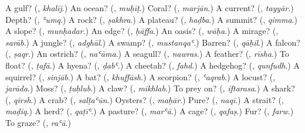 \begin{tcolorbox}[breakable,colback=teal!4,colframe=teal!35!black,title={Before you move on}]
A gulf? (\textbf{}, \emph{khalīj}.) An ocean? (\textbf{}, \emph{muḥīṭ}.) Coral? (\textbf{}, \emph{marjān}.) A current? (\textbf{}, \emph{tayyār}.) Depth? (\textbf{}, \emph{ʿumq}.) A rock? (\textbf{}, \emph{ṣakhra}.) A plateau? (\textbf{}, \emph{haḍba}.) A summit? (\textbf{}, \emph{qimma}.) A slope? (\textbf{}, \emph{munḥadar}.) An edge? (\textbf{}, \emph{ḥāffa}.) An oasis? (\textbf{}, \emph{wāḥa}.) A mirage? (\textbf{}, \emph{sarāb}.) A jungle? (\textbf{}, \emph{adghāl}.) A swamp? (\textbf{}, \emph{mustanqaʿ}.) Barren? (\textbf{}, \emph{qāḥil}.) A falcon? (\textbf{}, \emph{ṣaqr}.) An ostrich? (\textbf{}, \emph{naʿāma}.) A seagull? (\textbf{}, \emph{nawras}.) A feather? (\textbf{}, \emph{rīsha}.) To float? (\textbf{}, \emph{ṭafā}.) A hyena? (\textbf{}, \emph{ḍabʿ}.) A cheetah? (\textbf{}, \emph{fahd}.) A hedgehog? (\textbf{}, \emph{qunfudh}.) A squirrel? (\textbf{}, \emph{sinjāb}.) A bat? (\textbf{}, \emph{khuffāsh}.) A scorpion? (\textbf{}, \emph{ʿaqrab}.) A locust? (\textbf{}, \emph{jarāda}.) Moss? (\textbf{}, \emph{ṭuḥlub}.) A claw? (\textbf{}, \emph{mikhlab}.) To prey on? (\textbf{}, \emph{iftarasa}.) A shark? (\textbf{}, \emph{qirsh}.) A crab? (\textbf{}, \emph{salṭaʿūn}.) Oysters? (\textbf{}, \emph{maḥār}.) Pure? (\textbf{}, \emph{naqī}.) A strait? (\textbf{}, \emph{maḍīq}.) A herd? (\textbf{}, \emph{qaṭīʿ}.) A pasture? (\textbf{}, \emph{marʿā}.) A cage? (\textbf{}, \emph{qafaṣ}.) Fur? (\textbf{}, \emph{farw}.) To graze? (\textbf{}, \emph{raʿā}.)
\end{tcolorbox}
